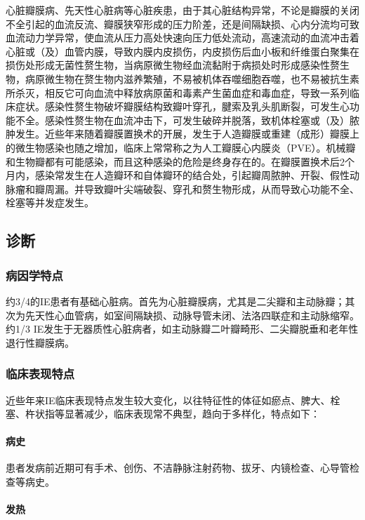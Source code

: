心脏瓣膜病、先天性心脏病等心脏疾患，由于其心脏结构异常，不论是瓣膜的关闭不全引起的血流反流、瓣膜狭窄形成的压力阶差，还是间隔缺损、心内分流均可致血流动力学异常，使血流从压力高处快速向压力低处流动，高速流动的血流冲击着心脏或（及）血管内膜，导致内膜内皮损伤，内皮损伤后血小板和纤维蛋白聚集在损伤处形成无菌性赘生物，当病原微生物经血流黏附于病损处时形成感染性赘生物，病原微生物在赘生物内滋养繁殖，不易被机体吞噬细胞吞噬，也不易被抗生素所杀灭，相反它可向血流中释放病原菌和毒素产生菌血症和毒血症，导致一系列临床症状。感染性赘生物破坏瓣膜结构致瓣叶穿孔，腱索及乳头肌断裂，可发生心功能不全。感染性赘生物在血流冲击下，可发生破碎并脱落，致机体栓塞或（及）脓肿发生。近些年来随着瓣膜置换术的开展，发生于人造瓣膜或重建（成形）瓣膜上的微生物感染也随之增加，临床上常常称之为人工瓣膜心内膜炎（PVE）。机械瓣和生物瓣都有可能感染，而且这种感染的危险是终身存在的。在瓣膜置换术后2个月内，感染常发生在人造瓣环和自体瓣环的结合处，引起瓣周脓肿、开裂、假性动脉瘤和瓣周漏。并导致瓣叶尖端破裂、穿孔和赘生物形成，从而导致心功能不全、栓塞等并发症发生。

\subsection{诊断}

\subsubsection{病因学特点}

约3/4的IE患者有基础心脏病。首先为心脏瓣膜病，尤其是二尖瓣和主动脉瓣；其次为先天性心血管病，如室间隔缺损、动脉导管未闭、法洛四联症和主动脉缩窄。约1/3
IE发生于无器质性心脏病者，如主动脉瓣二叶瓣畸形、二尖瓣脱垂和老年性退行性瓣膜病。

\subsubsection{临床表现特点}

近些年来IE临床表现特点发生较大变化，以往特征性的体征如瘀点、脾大、栓塞、杵状指等显著减少，临床表现常不典型，趋向于多样化，特点如下：

\paragraph{病史}

患者发病前近期可有手术、创伤、不洁静脉注射药物、拔牙、内镜检查、心导管检查等病史。

\paragraph{发热}


